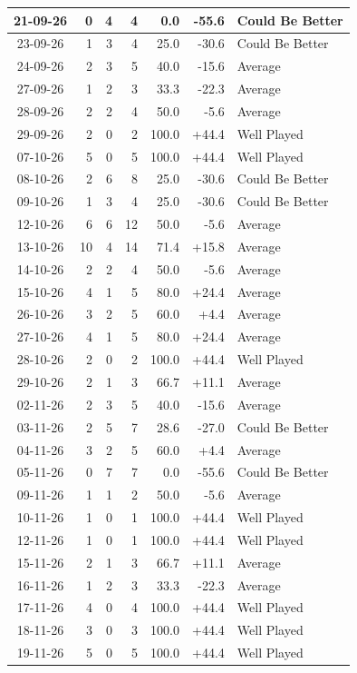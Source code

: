 \documentclass[journal]{IEEEtran}
\numberwithin{equation}{subsection}
\begin{document}
\begin{longtable}{|c|r|r|r|r|r|l|}
21-09-26 & 0 & 4 & 4 & 0.0 & -55.6 & Could Be Better\\ \hline
23-09-26 & 1 & 3 & 4 & 25.0 & -30.6 & Could Be Better\\ \hline
24-09-26 & 2 & 3 & 5 & 40.0 & -15.6 & Average\\ \hline
27-09-26 & 1 & 2 & 3 & 33.3 & -22.3 & Average\\ \hline
28-09-26 & 2 & 2 & 4 & 50.0 & -5.6 & Average\\ \hline
29-09-26 & 2 & 0 & 2 & 100.0 & +44.4 & Well Played\\ \hline
07-10-26 & 5 & 0 & 5 & 100.0 & +44.4 & Well Played\\ \hline
08-10-26 & 2 & 6 & 8 & 25.0 & -30.6 & Could Be Better\\ \hline
09-10-26 & 1 & 3 & 4 & 25.0 & -30.6 & Could Be Better\\ \hline
12-10-26 & 6 & 6 & 12 & 50.0 & -5.6 & Average\\ \hline
13-10-26 & 10 & 4 & 14 & 71.4 & +15.8 & Average\\ \hline
14-10-26 & 2 & 2 & 4 & 50.0 & -5.6 & Average\\ \hline
15-10-26 & 4 & 1 & 5 & 80.0 & +24.4 & Average\\ \hline
26-10-26 & 3 & 2 & 5 & 60.0 & +4.4 & Average\\ \hline
27-10-26 & 4 & 1 & 5 & 80.0 & +24.4 & Average\\ \hline
28-10-26 & 2 & 0 & 2 & 100.0 & +44.4 & Well Played\\ \hline
29-10-26 & 2 & 1 & 3 & 66.7 & +11.1 & Average\\ \hline
02-11-26 & 2 & 3 & 5 & 40.0 & -15.6 & Average\\ \hline
03-11-26 & 2 & 5 & 7 & 28.6 & -27.0 & Could Be Better\\ \hline
04-11-26 & 3 & 2 & 5 & 60.0 & +4.4 & Average\\ \hline
05-11-26 & 0 & 7 & 7 & 0.0 & -55.6 & Could Be Better\\ \hline
09-11-26 & 1 & 1 & 2 & 50.0 & -5.6 & Average\\ \hline
10-11-26 & 1 & 0 & 1 & 100.0 & +44.4 & Well Played\\ \hline
12-11-26 & 1 & 0 & 1 & 100.0 & +44.4 & Well Played\\ \hline
15-11-26 & 2 & 1 & 3 & 66.7 & +11.1 & Average\\ \hline
16-11-26 & 1 & 2 & 3 & 33.3 & -22.3 & Average\\ \hline
17-11-26 & 4 & 0 & 4 & 100.0 & +44.4 & Well Played\\ \hline
18-11-26 & 3 & 0 & 3 & 100.0 & +44.4 & Well Played\\ \hline
19-11-26 & 5 & 0 & 5 & 100.0 & +44.4 & Well Played\\ \hline

\end{longtable}
\normalsize
\end{document}
